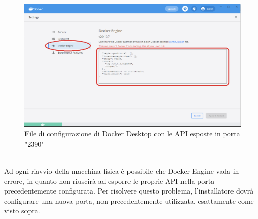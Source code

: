 \begin{figure}[!h]     
\centering 
    \includegraphics[width=0.7 \columnwidth]{immagini/img/docker_desktop_conf} 
    \caption{File di configurazione di Docker Desktop con le API esposte in porta "2390"}
\end{figure}\\
Ad ogni riavvio della macchina fisica è possibile che Docker Engine vada in errore, in quanto non riuscirà ad esporre le proprie API nella porta precedentemente configurata. Per risolvere questo problema, l'installatore dovrà configurare una nuova porta, non precedentemente utilizzata, esattamente come visto sopra.\\











